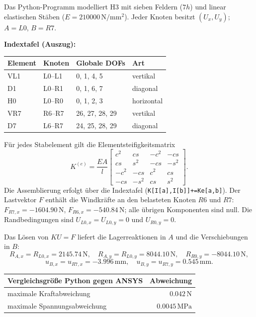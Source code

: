 \documentclass[10pt,a4paper]{article}
\begin{document}
Das Python-Programm modelliert H3 mit sieben Feldern (\(7h\)) und linear elastischen Stäben (\(E=210000\,\mathrm{N/mm^2}\)). Jeder Knoten besitzt \((U_x,U_y)\); \(A=L0\), \(B=R7\).

\textbf{Indextafel (Auszug):}
\begin{table}[H]\centering\footnotesize
\begin{tabular}{llll}
\toprule
Element & Knoten & Globale DOFs & Art\\
\midrule
VL1 & L0--L1 & 0, 1, 4, 5 & vertikal\\
D1 & L0--R1 & 0, 1, 6, 7 & diagonal\\
H0 & L0--R0 & 0, 1, 2, 3 & horizontal\\
VR7 & R6--R7 & 26, 27, 28, 29 & vertikal\\
D7 & L6--R7 & 24, 25, 28, 29 & diagonal\\
\bottomrule
\end{tabular}
\end{table}

Für jedes Stabelement gilt die Elementsteifigkeitsmatrix
\[
K^{(e)}=\frac{EA}{l}\begin{bmatrix}
c^2&cs&-c^2&-cs\\ cs&s^2&-cs&-s^2\\ -c^2&-cs&c^2&cs\\ -cs&-s^2&cs&s^2
\end{bmatrix}.
\]
Die Assemblierung erfolgt über die Indextafel (\texttt{K[I[a],I[b]]+=Ke[a,b]}). Der Lastvektor \(F\) enthält die Windkräfte an den belasteten Knoten \(R6\) und \(R7\):
\(F_{R7,x}=-1604.90\,\mathrm{N}\), \(F_{R6,x}=-540.84\,\mathrm{N}\); alle übrigen Komponenten sind null. Die Randbedingungen sind \(U_{L0,x}=U_{L0,y}=0\) und \(U_{R0,y}=0\).

Das Lösen von \(KU=F\) liefert die Lagerreaktionen in \(A\) und die Verschiebungen in \(B\):
\[
R_{A,x}=R_{L0,x}=2145.74\,\mathrm{N},\quad
R_{A,y}=R_{L0,y}=8044.10\,\mathrm{N},\quad
R_{R0,y}=-8044.10\,\mathrm{N},
\]
\[
u_{B,x}=u_{R7,x}=-3.996\,\mathrm{mm},\quad
u_{B,y}=u_{R7,y}=0.545\,\mathrm{mm}.
\]

\begin{table}[H]\centering\small
\begin{tabular}{lr}
\toprule
Vergleichsgröße Python gegen ANSYS & Abweichung\\
\midrule
maximale Kraftabweichung & \(0.042\,\mathrm{N}\)\\
maximale Spannungsabweichung & \(0.0045\,\mathrm{MPa}\)\\
\bottomrule
\end{tabular}
\end{table}
\end{document}
